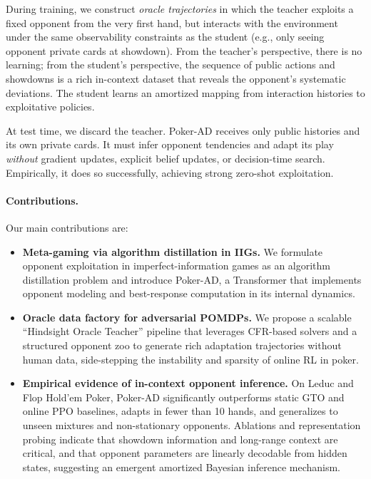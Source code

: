 \documentclass{article}
\begin{document}
During training, we construct \emph{oracle trajectories} in which the teacher exploits a fixed opponent from the very first hand, but interacts with the environment under the same observability constraints as the student (e.g., only seeing opponent private cards at showdown). From the teacher's perspective, there is no learning; from the student's perspective, the sequence of public actions and showdowns is a rich in-context dataset that reveals the opponent's systematic deviations. The student learns an amortized mapping from interaction histories to exploitative policies.

At test time, we discard the teacher. Poker-AD receives only public histories and its own private cards. It must infer opponent tendencies and adapt its play \emph{without} gradient updates, explicit belief updates, or decision-time search. Empirically, it does so successfully, achieving strong zero-shot exploitation.

\paragraph{Contributions.}
Our main contributions are:
\begin{itemize}[leftmargin=*]
    \item \textbf{Meta-gaming via algorithm distillation in IIGs.} We formulate opponent exploitation in imperfect-information games as an algorithm distillation problem and introduce Poker-AD, a Transformer that implements opponent modeling and best-response computation in its internal dynamics.
    \item \textbf{Oracle data factory for adversarial POMDPs.} We propose a scalable ``Hindsight Oracle Teacher'' pipeline that leverages CFR-based solvers and a structured opponent zoo to generate rich adaptation trajectories without human data, side-stepping the instability and sparsity of online RL in poker.
    \item \textbf{Empirical evidence of in-context opponent inference.} On Leduc and Flop Hold'em Poker, Poker-AD significantly outperforms static GTO and online PPO baselines, adapts in fewer than 10 hands, and generalizes to unseen mixtures and non-stationary opponents. Ablations and representation probing indicate that showdown information and long-range context are critical, and that opponent parameters are linearly decodable from hidden states, suggesting an emergent amortized Bayesian inference mechanism.
\end{itemize}
\end{document}
